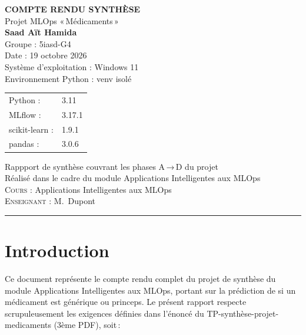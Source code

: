\documentclass[12pt,a4paper]{report}
\begin{document}
\begin{titlepage}
    \centering
    \vspace{2cm}
    
    {\LARGE \bfseries COMPTE RENDU SYNTHÈSE} \\
    \vspace{0.5cm}
    {\large Projet MLOps « Médicaments »} \\
    \vspace{1cm}
    {\Large \textbf{Saad Aït Hamida}} \\
    \vspace{0.5cm}
    {\large Groupe : 5iasd-G4} \\
    \vspace{1cm}
    {\large Date : 19 octobre 2026} \\
    \vspace{0.5cm}
    {\large Système d'exploitation : Windows 11} \\
    \vspace{0.5cm}
    {\large Environnement Python : venv isolé} \\
    \vspace{0.3cm}
    \begin{tabular}{ll}
        Python : & 3.11 \\
        MLflow : & 3.17.1 \\
        scikit-learn : & 1.9.1 \\
        pandas : & 3.0.6 \\
    \end{tabular}
    \vspace{2cm}
    
    {\large Rappport de synthèse couvrant les phases A → D du projet} \\
    \vspace{0.5cm}
    {\large Réalisé dans le cadre du module Applications Intelligentes aux MLOps} \\
    
    \vfill
    {\large \textsc{Cours :} Applications Intelligentes aux MLOps} \\
    {\large \textsc{Enseignant :} M.~Dupont} \\
    
    \vspace{1cm}
    {\rule{0.8\textwidth}{0.5pt}}
\end{titlepage}

\setcounter{page}{1}

\chapter*{Introduction}
Ce document représente le compte rendu complet du projet de synthèse du module Applications Intelligentes aux MLOps, portant sur la prédiction de si un médicament est générique ou princeps. Le présent rapport respecte scrupuleusement les exigences définies dans l'énoncé du TP-synthèse-projet-medicaments (3ème PDF), soit :
\end{document}
